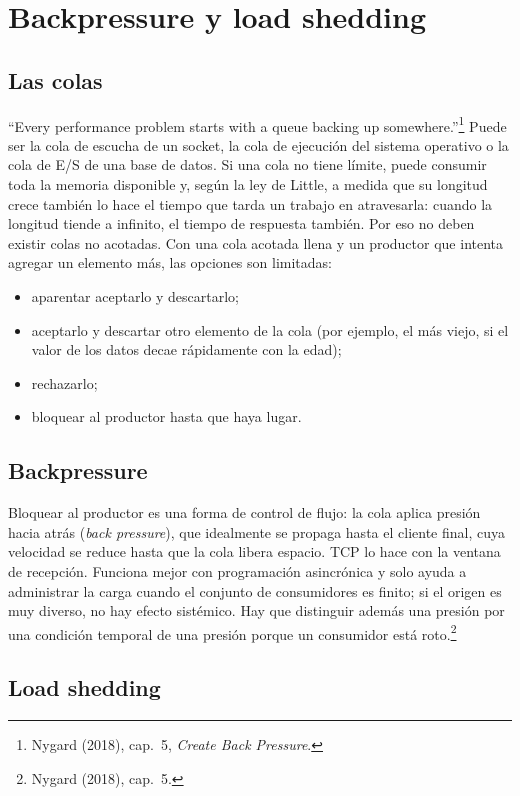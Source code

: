 \documentclass[variant=apuntes,cover=institutional,mode=screen]{ua-engineering-v6-article}
\begin{document}
\section{Backpressure y load shedding}\label{sec:backpressure}

\subsection{Las colas}

``Every performance problem starts with a queue backing up somewhere.''\footnote{Nygard (2018), cap.~5, \emph{Create Back Pressure}.} Puede ser la cola de escucha de un socket, la cola de ejecución del sistema operativo o la cola de E/S de una base de datos. Si una cola no tiene límite, puede consumir toda la memoria disponible y, según la ley de Little, a medida que su longitud crece también lo hace el tiempo que tarda un trabajo en atravesarla: cuando la longitud tiende a infinito, el tiempo de respuesta también. Por eso no deben existir colas no acotadas. Con una cola acotada llena y un productor que intenta agregar un elemento más, las opciones son limitadas:
\begin{itemize}
\item aparentar aceptarlo y descartarlo;
\item aceptarlo y descartar otro elemento de la cola (por ejemplo, el más viejo, si el valor de los datos decae rápidamente con la edad);
\item rechazarlo;
\item bloquear al productor hasta que haya lugar.
\end{itemize}

\subsection{Backpressure}

Bloquear al productor es una forma de control de flujo: la cola aplica presión hacia atrás (\emph{back pressure}), que idealmente se propaga hasta el cliente final, cuya velocidad se reduce hasta que la cola libera espacio. TCP lo hace con la ventana de recepción. Funciona mejor con programación asincrónica y solo ayuda a administrar la carga cuando el conjunto de consumidores es finito; si el origen es muy diverso, no hay efecto sistémico. Hay que distinguir además una presión por una condición temporal de una presión porque un consumidor está roto.\footnote{Nygard (2018), cap.~5.}

\subsection{Load shedding}
\end{document}
